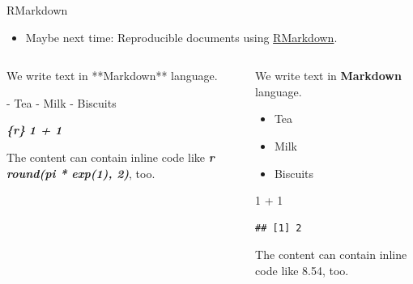 \documentclass[,aspectratio=43]{beamer}
\newenvironment{Shaded}{\begin{snugshade}}{\end{snugshade}}
\newcommand{\DecValTok}[1]{\textcolor[rgb]{0.25,0.63,0.44}{#1}}
\newcommand{\InformationTok}[1]{\textcolor[rgb]{0.38,0.63,0.69}{\textbf{\textit{#1}}}}
\newcommand{\NormalTok}[1]{#1}
\newcommand{\SpecialCharTok}[1]{\textcolor[rgb]{0.25,0.44,0.63}{#1}}
\newcommand{\SpecialStringTok}[1]{\textcolor[rgb]{0.73,0.40,0.53}{#1}}
\providecommand{\tightlist}{%
  \setlength{\itemsep}{0pt}\setlength{\parskip}{0pt}}
\begin{document}
\begin{frame}[fragile]{RMarkdown}
\protect\hypertarget{rmarkdown}{}
\begin{itemize}
\tightlist
\item
  Maybe next time: Reproducible documents using
  \href{https://rmarkdown.rstudio.com}{RMarkdown}.
\end{itemize}

\begin{columns}[T]
\begin{column}{0.48\textwidth}
\small
\vspace{-1em}

\begin{Shaded}
\begin{Highlighting}[]
\NormalTok{We write text in **Markdown**}
\NormalTok{language.}

\SpecialStringTok{{-} }\NormalTok{Tea}
\SpecialStringTok{{-} }\NormalTok{Milk}
\SpecialStringTok{{-} }\NormalTok{Biscuits}

\InformationTok{\textasciigrave{}\textasciigrave{}\textasciigrave{}\{r\}}
\InformationTok{1 + 1}
\InformationTok{\textasciigrave{}\textasciigrave{}\textasciigrave{}}

\NormalTok{The content can contain inline }
\NormalTok{code like}
\InformationTok{\textasciigrave{}r round(pi * exp(1), 2)\textasciigrave{}}\NormalTok{, too.}
\end{Highlighting}
\end{Shaded}
\end{column}

\begin{column}{0.43\textwidth}
We write text in \textbf{Markdown} language.

\begin{itemize}
\tightlist
\item
  Tea
\item
  Milk
\item
  Biscuits
\end{itemize}

\begin{Shaded}
\begin{Highlighting}[]
\DecValTok{1} \SpecialCharTok{+} \DecValTok{1}
\end{Highlighting}
\end{Shaded}

\begin{verbatim}
## [1] 2
\end{verbatim}

The content can contain inline code like 8.54, too.
\end{column}
\end{columns}
\end{frame}
\end{document}
